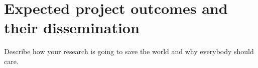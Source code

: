 \section{Expected project outcomes and their dissemination}
Describe how your research is going to save the world and why everybody should care.